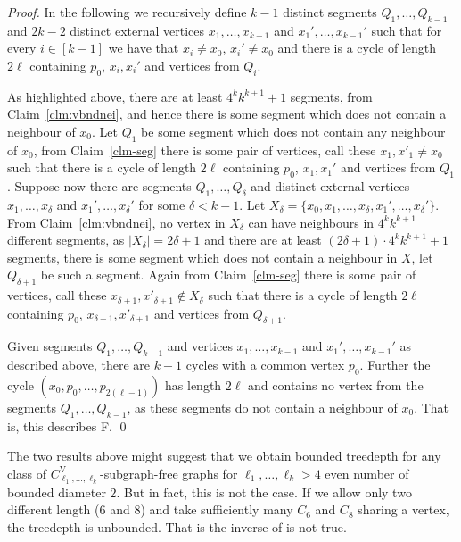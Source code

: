 \documentclass[runningheads,envcountsame]{llncs}
\newcommand{\sharedVertex}[1]{C^{\mathrm{V}}_{#1}}
\newcommand{\forbiddenGraph}{F}
\begin{document}
\begin{proof}
    In the following we recursively define $k-1$ distinct segments $Q_1,\dots, Q_{k-1}$ and $2k-2$ distinct external vertices $x_1, \dots, x_{k-1}$ and $x_1',\dots, x_{k-1}'$  such that for every $i\in [k-1]$ we have that $x_i\neq x_0$, $x_i'\neq x_0$ and there is a cycle of length $2\ell$ containing $p_0$, $x_i, x_i'$ and vertices from $Q_i$.

    As highlighted above, there are at least $4^kk^{k+1}+1$ segments, from Claim~\ref{clm:vbndnei}, and hence there is some segment which does not contain a neighbour of $x_0$. Let $Q_1$ be some segment which does not contain any neighbour of $x_0$, from Claim~\ref{clm-seg} there is some pair of vertices, call these $x_1, x'_1 \neq x_0$ such that there is a cycle of length $2\ell$ containing $p_0$, $x_1, x_1'$ and vertices from $Q_1$.
    Suppose now there are segments $Q_1,\dots, Q_{\delta}$ and distinct external vertices $x_1, \dots, x_{\delta}$ and $x_1',\dots, x_{\delta}'$ for some $\delta < k-1$. Let $X_{\delta} = \{x_0,x_1, \dots, x_{\delta}, x_1',\dots, x_{\delta}'\}$. From Claim~\ref{clm:vbndnei}, no vertex in $X_{\delta}$ can have neighbours in $4^kk^{k+1}$ different segments, as $|X_{\delta}| = 2\delta+1$ and there are at least $(2\delta+1) \cdot 4^kk^{k+1}+1$ segments, there is some segment which does not contain a neighbour in $X$, let $Q_{\delta+1}$ be such a segment. Again from Claim~\ref{clm-seg} there is some pair of vertices, call these $x_{\delta+1}, x'_{\delta+1} \notin X_{\delta}$ such that there is a cycle of length $2\ell$ containing $p_0$, $x_{\delta+1}, x'_{\delta+1}$ and vertices from $Q_{\delta+1}$.

    Given segments $Q_1,\dots, Q_{k-1}$ and vertices $x_1, \dots, x_{k-1}$ and $x_1',\dots, x_{k-1}'$ as described above, there are $k-1$ cycles with a common vertex $p_0$. Further the cycle $(x_0, p_0, \ldots, p_{2(\ell-1)})$ has length $2\ell$ and contains no vertex from the segments $Q_1,\dots, Q_{k-1}$, as these segments do not contain a neighbour of $x_0$. That is, this describes \forbiddenGraph. \qed
\end{proof}



The two results above 
might suggest that we obtain bounded treedepth for any class of $\sharedVertex{\ell_1,\dots,\ell_k}$-subgraph-free graphs for $\ell_1,\dots,\ell_k>4$ even number of bounded diameter $2$. But in fact, this is not the case. If we allow only two different length ($6$ and $8$) and take sufficiently many $C_6$ and $C_8$ sharing a vertex, the treedepth is unbounded. That is the inverse of  is not true.
\end{document}
